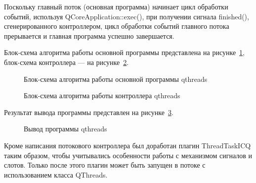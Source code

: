 Поскольку главный поток (основная программа) начинает цикл обработки событий, используя QCoreApplication::exec(), при получении сигнала finished(), сгенерированного контроллером, цикл обработки событий главного потока прерывается и главная программа успешно завершается. 

Блок-схема алгоритма работы основной программы представлена на рисунке~\ref{main-qthreads:main-qthreads}, блок-схема контроллера --- на рисунке~\ref{controller-qthreads:controller-qthreads}. 

\begin{figure}[h!]
\caption{ Блок-схема алгоритма работы основной программы qthreads }
\label{main-qthreads:main-qthreads}
\end{figure}

\clearpage

\begin{figure}[ht]
\caption{ Блок-схема алгоритма работы контроллера qthreads }
\label{controller-qthreads:controller-qthreads}
\end{figure}

\clearpage

Результат вывода программы представлен на рисунке~\ref{program-output:program-output}.

\begin{figure}[h!]
\caption{ Вывод программы qthreads }
\label{program-output:program-output}
\end{figure}

Кроме написания потокового контроллера был доработан плагин ThreadTaskICQ таким образом, чтобы учитывались особенности работы с механизмом сигналов и слотов. Только после этого плагин может быть запущен в потоке с использованием класса QThreads.  

\clearpage
